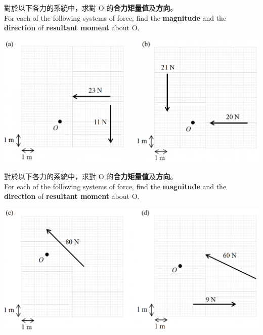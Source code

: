 \documentclass[beamer=true]{standalone}
\begin{document}
\begin{eg}
    對於以下各力的系統中，求對 O 的\textbf{合力矩量值}及\textbf{方向}。 \\For each of the following systems of force, find the \textbf{magnitude} and the \textbf{direction} of \textbf{resultant moment} about O.
        {\par\centering
            \includegraphics[width=\textwidth]{assets/a1fab181.png}
            \par}
\end{eg}
\begin{eg}
    對於以下各力的系統中，求對 O 的\textbf{合力矩量值}及\textbf{方向}。 \\For each of the following systems of force, find the \textbf{magnitude} and the \textbf{direction} of \textbf{resultant moment} about O.
        {\par\centering
            \includegraphics[width=\textwidth]{assets/d462b1fc.png}
            \par}
\end{eg}
\end{document}
